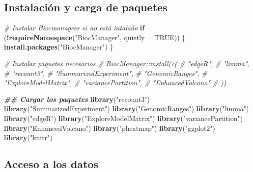 \documentclass[
  spanish,
  11pt,
]{article}
\newenvironment{Shaded}{\begin{snugshade}}{\end{snugshade}}
\newcommand{\AttributeTok}[1]{\textcolor[rgb]{0.13,0.29,0.53}{#1}}
\newcommand{\CommentTok}[1]{\textcolor[rgb]{0.56,0.35,0.01}{\textit{#1}}}
\newcommand{\ConstantTok}[1]{\textcolor[rgb]{0.56,0.35,0.01}{#1}}
\newcommand{\ControlFlowTok}[1]{\textcolor[rgb]{0.13,0.29,0.53}{\textbf{#1}}}
\newcommand{\DocumentationTok}[1]{\textcolor[rgb]{0.56,0.35,0.01}{\textbf{\textit{#1}}}}
\newcommand{\FunctionTok}[1]{\textcolor[rgb]{0.13,0.29,0.53}{\textbf{#1}}}
\newcommand{\NormalTok}[1]{#1}
\newcommand{\SpecialCharTok}[1]{\textcolor[rgb]{0.81,0.36,0.00}{\textbf{#1}}}
\newcommand{\StringTok}[1]{\textcolor[rgb]{0.31,0.60,0.02}{#1}}
\begin{document}
\subsection{Instalación y carga de
paquetes}\label{instalaciuxf3n-y-carga-de-paquetes}

\begin{Shaded}
\begin{Highlighting}[]
\CommentTok{\# Instalar Biocmanageer si no está intalado}
\ControlFlowTok{if}\NormalTok{ (}\SpecialCharTok{!}\FunctionTok{requireNamespace}\NormalTok{(}\StringTok{"BiocManager"}\NormalTok{, }\AttributeTok{quietly =} \ConstantTok{TRUE}\NormalTok{)) \{}
    \FunctionTok{install.packages}\NormalTok{(}\StringTok{"BiocManager"}\NormalTok{)}
\NormalTok{\}}

\CommentTok{\# Instalar paquetes necesarios}
\CommentTok{\# BiocManager::install(c(}
\CommentTok{\#   "edgeR",}
\CommentTok{\#   "limma",}
\CommentTok{\#   "recount3",}
\CommentTok{\#   "SummarizedExperiment",}
\CommentTok{\#   "GenomicRanges",}
\CommentTok{\#   "ExploreModelMatrix",}
\CommentTok{\#   "variancePartition",}
\CommentTok{\#   "EnhancedVolcano"}
\CommentTok{\# ))}

\DocumentationTok{\#\# Cargar los paquetes}
\FunctionTok{library}\NormalTok{(}\StringTok{"recount3"}\NormalTok{)}
\FunctionTok{library}\NormalTok{(}\StringTok{"SummarizedExperiment"}\NormalTok{)}
\FunctionTok{library}\NormalTok{(}\StringTok{"GenomicRanges"}\NormalTok{)}
\FunctionTok{library}\NormalTok{(}\StringTok{"limma"}\NormalTok{)}
\FunctionTok{library}\NormalTok{(}\StringTok{"edgeR"}\NormalTok{)}
\FunctionTok{library}\NormalTok{(}\StringTok{"ExploreModelMatrix"}\NormalTok{)}
\FunctionTok{library}\NormalTok{(}\StringTok{"variancePartition"}\NormalTok{)}
\FunctionTok{library}\NormalTok{(}\StringTok{"EnhancedVolcano"}\NormalTok{)}
\FunctionTok{library}\NormalTok{(}\StringTok{"pheatmap"}\NormalTok{)}
\FunctionTok{library}\NormalTok{(}\StringTok{"ggplot2"}\NormalTok{)}
\FunctionTok{library}\NormalTok{(}\StringTok{"knitr"}\NormalTok{)}
\end{Highlighting}
\end{Shaded}

\subsection{Acceso a los datos}\label{acceso-a-los-datos}
\end{document}
